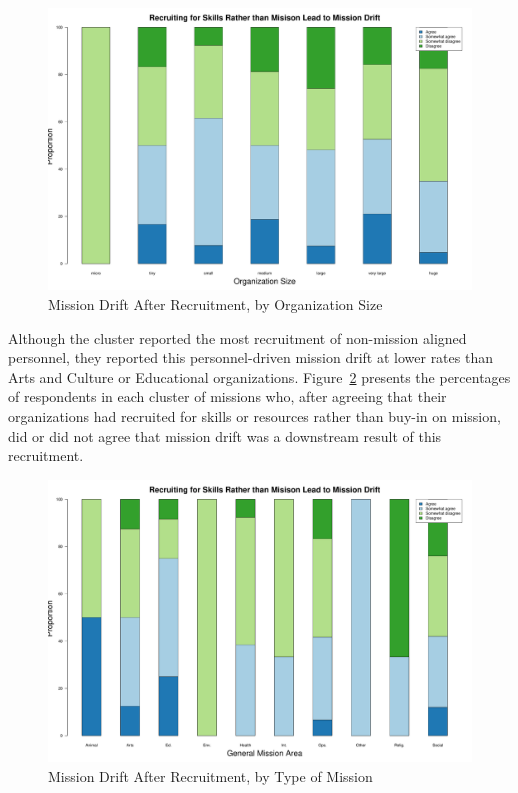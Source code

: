 \begin{figure}[t]
\includegraphics[width=.85\columnwidth]{./Pictures/NonAlignedRecruitmentMDSize.pdf}
\centering
\caption{Mission Drift After Recruitment, by Organization Size}
\label{fig:nonalignedMDsize}
\end{figure}

Although the  cluster reported the most recruitment of non-mission aligned personnel, they reported this personnel-driven mission drift at lower rates than Arts and Culture or Educational organizations. Figure~\ref{fig:nonalignedMD} presents the percentages of respondents in each cluster of missions who, after agreeing that their organizations had recruited for skills or resources rather than buy-in on mission, did or did not agree that mission drift was a downstream result of this recruitment. 

\begin{figure}[t]
\includegraphics[width=.95\columnwidth]{./Pictures/NonAlignedRecruitmentMD.pdf}
\centering
\caption{Mission Drift After Recruitment, by Type of Mission}
\label{fig:nonalignedMD}
\end{figure}

